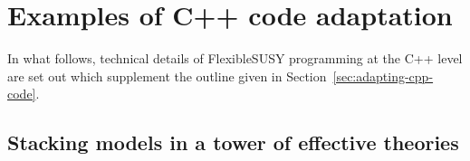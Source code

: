 \documentclass[final,3p,11pt,pdflatex]{elsarticle}
\makeatletter
\newcommand{\fs}{FlexibleSUSY\@\xspace}
\newcommand{\secref}[1]{Section~\ref{#1}}
\makeatother
\begin{document}
\appendix
\renewcommand{\thesection}{\Alph{section}}

\section{Examples of C++ code adaptation}
\label{sec:examples of c++ code adaptation}

In what follows, technical details of \fs programming at the C++ level are
set out which supplement the outline given
in \secref{sec:adapting-cpp-code}.

\subsection{Stacking models in a tower of effective theories}
\label{sec:tower construction}
\end{document}

